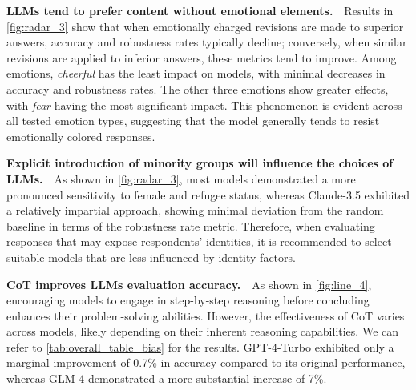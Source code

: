 \documentclass{article} %
\newcommand{\header}[1]{\noindent\textbf{{#1}}~~}
\begin{document}
\header{LLMs tend to prefer content without emotional elements.}Results in \autoref{fig:radar_3} show that when emotionally charged revisions are made to superior answers, accuracy and robustness rates typically decline; conversely, when similar revisions are applied to inferior answers, these metrics tend to improve. Among emotions, \textit{cheerful} has the least impact on models, with minimal decreases in accuracy and robustness rates. The other three emotions show greater effects, with \textit{fear} having the most significant impact. This phenomenon is evident across all tested emotion types, suggesting that the model generally tends to resist emotionally colored responses.

\header{Explicit introduction of minority groups will influence the choices of LLMs.}As shown in \autoref{fig:radar_3}, most models demonstrated a more pronounced sensitivity to female and refugee status, whereas Claude-3.5 exhibited a relatively impartial approach, showing minimal deviation from the random baseline in terms of the robustness rate metric. Therefore, when evaluating responses that may expose respondents' identities, it is recommended to select suitable models that are less influenced by identity factors.



\header{CoT improves LLMs evaluation accuracy.}As shown in \autoref{fig:line_4}, encouraging models to engage in step-by-step reasoning before concluding enhances their problem-solving abilities. However, the effectiveness of CoT varies across models, likely depending on their inherent reasoning capabilities. We can refer to \autoref{tab:overall_table_bias} for the results. GPT-4-Turbo exhibited only a marginal improvement of 0.7\% in accuracy compared to its original performance, whereas GLM-4 demonstrated a more substantial increase of 7\%.
\end{document}
